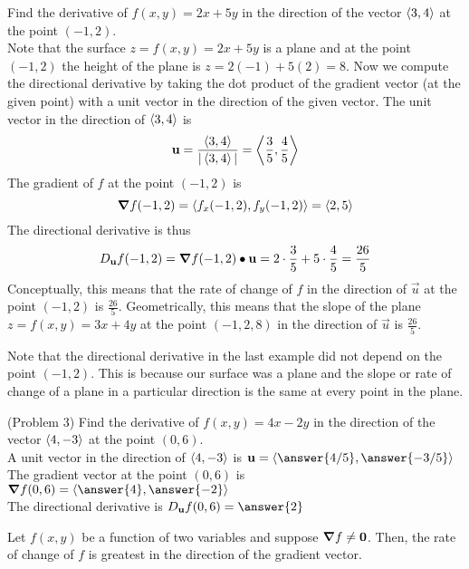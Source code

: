 \documentclass[handout]{ximera}
\begin{document}
\begin{example}[Example 3]
Find the derivative of $f(x,y) = 2x + 5y$ in the direction of the vector $\left\langle 3,4\right\rangle$ at the point $(-1, 2)$.\\
Note that the surface $z = f(x,y) = 2x + 5y$ is a plane and at the point $(-1, 2)$ the height of the plane is $z = 2(-1) + 5(2) = 8$.
Now we compute the directional derivative by taking the dot product of the gradient vector (at the given point) with a unit 
vector in the direction of the given vector.
The unit vector in the direction of $\left\langle 3,4\right\rangle$ is
\[
\mathbf u = \frac{\left\langle 3,4\right\rangle}{|\left\langle 3,4\right\rangle|} = \left\langle \frac35, \frac45\right\rangle
\]
The gradient of $f$ at the point $(-1, 2)$ is
\[
\boldsymbol\nabla f(-1, 2) = \left\langle f_x(-1,2), f_y(-1,2)\right\rangle = \left\langle 2,5\right\rangle
\]
The directional derivative is thus
\[
D_{\mathbf u} f (-1, 2) = \boldsymbol\nabla f(-1, 2) \bullet \mathbf u = 2 \cdot \frac35 + 5 \cdot \frac45 = \frac{26}{5}
\]
Conceptually, this means that the rate of change of $f$ in the direction of $\vec u$ at the point $(-1, 2)$ is $\frac{26}{5}$.
Geometrically, this means that the slope of the plane $z = f(x,y) = 3x + 4y$ at the point $(-1, 2, 8)$ in the direction of $\vec u$ is $\frac{26}{5}$.
\end{example}

\begin{remark}
Note that the directional derivative in the last example did not depend on the point $(-1, 2)$.  
This is because our surface was a plane and the slope or rate of change of a plane in a particular direction is the same at every point in the plane.
\end{remark}

\begin{problem}(Problem 3)
Find the derivative of $f(x,y) = 4x - 2y$ in the direction of the vector $\left\langle 4, -3\right\rangle$ at the point $(0, 6)$.\\
A unit vector in the direction of $\left\langle 4, -3\right\rangle$ is $\vec u = \vector{\answer{4/5}, \answer{-3/5}}$\\
The gradient vector at the point $(0,6)$ is $\grad f(0,6) = \vector{\answer{4}, \answer{-2}}$\\
The directional derivative is $D_{\vec u} f(0,6) = \answer{2}$
\end{problem}

\begin{proposition}
Let $f(x,y)$ be a function of two variables and suppose $\boldsymbol\nabla f \neq \mathbf 0$. Then, the rate of change of $f$ is greatest in the direction of the gradient vector.

\end{proposition}
\end{document}
